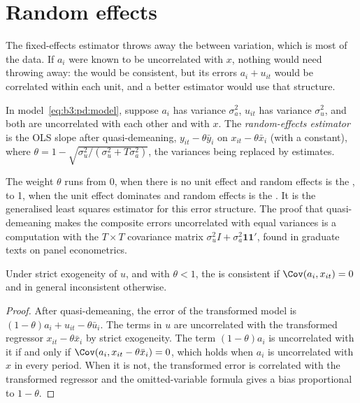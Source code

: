 \section{Random effects}\label{sec:b3:panel-data:random-effects}

The fixed-effects estimator throws away the between variation, which is most of
the data. If $a_i$ were known to be uncorrelated with $x$, nothing would need
throwing away: the  would be consistent, but its errors $a_i +
u_{it}$ would be correlated within each unit, and a better estimator would use
that structure.

\begin{definition}\label{def:b3:panel-data:random-effects}
In model~\eqref{eq:b3:pd:model}, suppose $a_i$ has variance $\sigma_a^2$, $u_{it}$
has variance $\sigma_u^2$, and both are uncorrelated with each other and with
$x$. The \emph{random-effects estimator} is the OLS slope after quasi-demeaning,
$y_{it} - \theta \bar y_i$ on $x_{it} - \theta \bar x_i$ (with a constant), where
$\theta = 1 - \sqrt{\sigma_u^2/(\sigma_u^2 + T\sigma_a^2)}$, the variances being
replaced by estimates.
\end{definition}

The weight $\theta$ runs from 0, when there is no unit effect and random effects
is the , to 1, when the unit effect dominates and random
effects is the . It is the generalised least squares estimator
for this error structure.
\admitted
The proof that quasi-demeaning makes the composite errors uncorrelated with
equal variances is a computation with the $T \times T$ covariance matrix
$\sigma_u^2 I + \sigma_a^2 \mathbf 1 \mathbf 1'$, found in graduate texts on panel
econometrics.

\begin{proposition}\label{prop:b3:panel-data:re}
Under strict exogeneity of $u$, and with $\theta < 1$, the  is consistent if $\Cov(a_i, x_{it}) = 0$ and in general inconsistent
otherwise.
\end{proposition}

\begin{proof}
After quasi-demeaning, the error of the transformed model is $(1 - \theta)a_i +
u_{it} - \theta \bar u_i$. The terms in $u$ are uncorrelated with the transformed
regressor $x_{it} - \theta \bar x_i$ by strict exogeneity. The term $(1 -
\theta)a_i$ is uncorrelated with it if and only if $\Cov(a_i, x_{it} - \theta \bar
x_i) = 0$, which holds when $a_i$ is uncorrelated with $x$ in every period. When
it is not, the transformed error is correlated with the transformed regressor
and the omitted-variable formula gives a bias proportional to $1 - \theta$.
\end{proof}

